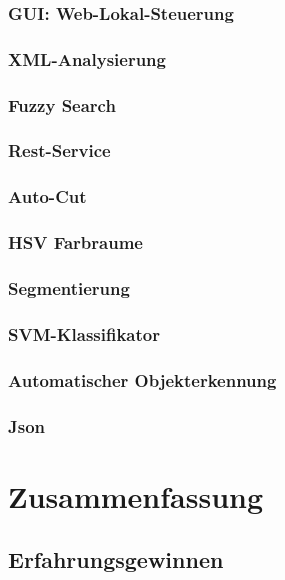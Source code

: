 \documentclass[10pt,a4paper]{report}
\begin{document}
\subsection{GUI: Web-Lokal-Steuerung}

\subsection{XML-Analysierung}

\subsection{Fuzzy Search}

\subsection{Rest-Service}

\subsection{Auto-Cut}

\subsection{HSV Farbraume}

\subsection{Segmentierung}

\subsection{SVM-Klassifikator}

\subsection{Automatischer Objekterkennung}

\subsection{Json}

\chapter{Zusammenfassung}

\section{Erfahrungsgewinnen}
\end{document}
